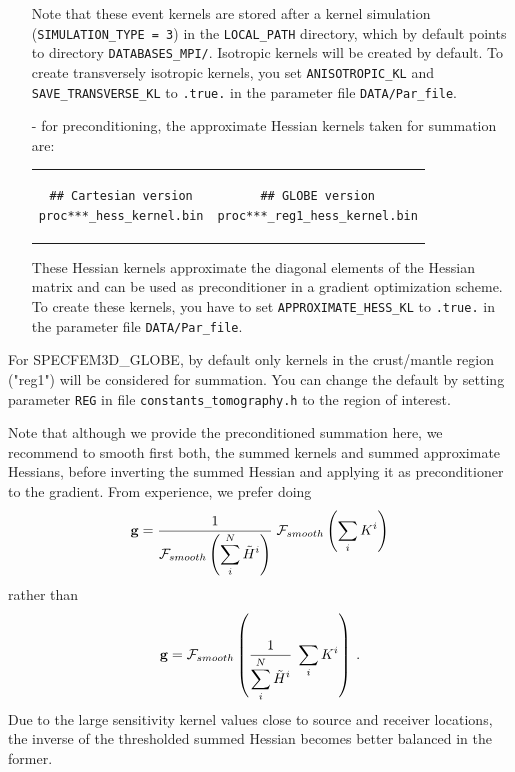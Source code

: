 \begin{itemize}
Note that these event kernels are stored after a kernel simulation (\texttt{SIMULATION\_TYPE = 3}) in the \texttt{LOCAL\_PATH} directory, which by default points to directory \texttt{DATABASES\_MPI/}. Isotropic kernels will be created by default. To create transversely isotropic kernels, you set \texttt{ANISOTROPIC\_KL} and \texttt{SAVE\_TRANSVERSE\_KL} to \texttt{.true.} in the parameter file \texttt{DATA/Par\_file}. \newline

\item [- ] for preconditioning, the approximate Hessian kernels taken for summation are:\newline
\begin{tabular}{ c c }
\begin{minipage}{3in}
\begin{verbatim}
## Cartesian version
proc***_hess_kernel.bin
\end{verbatim}
\end{minipage}
&
\begin{minipage}{3in}
\begin{verbatim}
## GLOBE version
proc***_reg1_hess_kernel.bin
\end{verbatim}
\end{minipage}
\end{tabular}\newline

These Hessian kernels approximate the diagonal elements of the Hessian matrix and can be used as preconditioner in a gradient optimization scheme.
To create these kernels, you have to set \texttt{APPROXIMATE\_HESS\_KL} to \texttt{.true.} in the parameter file \texttt{DATA/Par\_file}.\newline

\end{itemize}


For SPECFEM3D\_GLOBE, by default only kernels in the crust/mantle region ("reg1") will be considered for summation. You can change the default by setting parameter \texttt{REG} in file \texttt{constants\_tomography.h} to the region of interest. \newline


Note that although we provide the preconditioned summation here, we recommend to smooth first both, the summed kernels and summed approximate Hessians, before inverting the summed Hessian and applying it as preconditioner to the gradient. From experience, we prefer doing
\begin{equation}
\mathbf{g} =  \frac{1}{\mathcal{F}_{smooth} \left( \displaystyle\sum^{N}_i \tilde{H}^{i} \right) }  \; \mathcal{F}_{smooth} \left( \displaystyle\sum_i K^{i}  \right) \nonumber
\end{equation}
rather than
\begin{equation}
\mathbf{g} = \mathcal{F}_{smooth} \left( \frac{1}{\displaystyle\sum^{N}_i \tilde{H}^{i}}  \;  \displaystyle\sum_i K^{i}  \right) \: . \nonumber
\end{equation}
Due to the large sensitivity kernel values close to source and receiver locations, the inverse of the thresholded summed Hessian becomes better balanced in the former.


